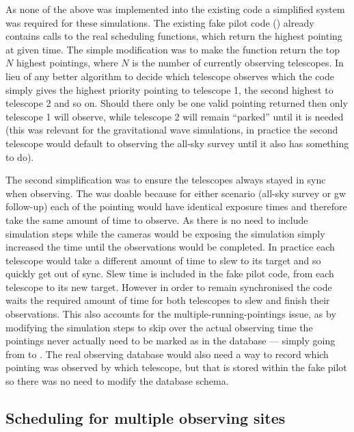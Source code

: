 \begin{colsection}
\begin{colsection}
As none of the above was implemented into the existing code a simplified system was required for these simulations. The existing fake pilot code () already contains calls to the real scheduling functions, which return the highest pointing at given time. The simple modification was to make the function return the top $N$ highest pointings, where $N$ is the number of currently observing telescopes. In lieu of any better algorithm to decide which telescope observes which the code simply gives the highest priority pointing to telescope 1, the second highest to telescope 2 and so on. Should there only be one valid pointing returned then only telescope 1 will observe, while telescope 2 will remain ``parked'' until it is needed (this was relevant for the gravitational wave simulations, in practice the second telescope would default to observing the all-sky survey until it also has something to do).

The second simplification was to ensure the telescopes always stayed in sync when observing. The was doable because for either scenario (all-sky survey or \gls{gw} follow-up) each of the pointing would have identical exposure times and therefore take the same amount of time to observe. As there is no need to include simulation steps while the cameras would be exposing the simulation simply increased the time until the observations would be completed. In practice each telescope would take a different amount of time to slew to its target and so quickly get out of sync. Slew time is included in the fake pilot code, from each telescope to its new target. However in order to remain synchronised the code waits the required amount of time for both telescopes to slew and finish their observations. This also accounts for the multiple-running-pointings issue, as by modifying the simulation steps to skip over the actual observing time the pointings never actually need to be marked as  in the database --- simply going from  to . The real observing database would also need a way to record which pointing was observed by which telescope, but that is stored within the fake pilot so there was no need to modify the database schema.

\end{colsection}


\subsection{Scheduling for multiple observing sites}
\label{sec:multi_site_scheduling}
\begin{colsection}


\end{colsection}
\end{colsection}
